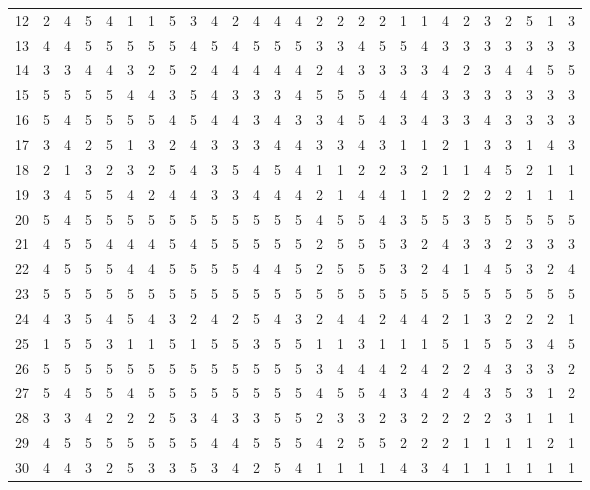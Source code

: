 \begin{table}[htbp]
{\begin{tabular}{c *{26}{c}}
12 & 2 & 4 & 5 & 4 & 1 & 1 & 5 & 3 & 4 & 2 & 4 & 4 & 4 & 2 & 2 & 2 & 2 & 1 & 1 & 4 & 2 & 3 & 2 & 5 & 1 & 3 \\
13 & 4 & 4 & 5 & 5 & 5 & 5 & 5 & 4 & 5 & 4 & 5 & 5 & 5 & 3 & 3 & 4 & 5 & 5 & 4 & 3 & 3 & 3 & 3 & 3 & 3 & 3 \\
14 & 3 & 3 & 4 & 4 & 3 & 2 & 5 & 2 & 4 & 4 & 4 & 4 & 4 & 2 & 4 & 3 & 3 & 3 & 3 & 4 & 2 & 3 & 4 & 4 & 5 & 5 \\
15 & 5 & 5 & 5 & 5 & 4 & 4 & 3 & 5 & 4 & 3 & 3 & 3 & 4 & 5 & 5 & 5 & 4 & 4 & 4 & 3 & 3 & 3 & 3 & 3 & 3 & 3 \\
16 & 5 & 4 & 5 & 5 & 5 & 5 & 4 & 5 & 4 & 4 & 3 & 4 & 3 & 3 & 4 & 5 & 4 & 3 & 4 & 3 & 3 & 4 & 3 & 3 & 3 & 3 \\
17 & 3 & 4 & 2 & 5 & 1 & 3 & 2 & 4 & 3 & 3 & 3 & 4 & 4 & 3 & 3 & 4 & 3 & 1 & 1 & 2 & 1 & 3 & 3 & 1 & 4 & 3 \\
18 & 2 & 1 & 3 & 2 & 3 & 2 & 5 & 4 & 3 & 5 & 4 & 5 & 4 & 1 & 1 & 2 & 2 & 3 & 2 & 1 & 1 & 4 & 5 & 2 & 1 & 1 \\
19 & 3 & 4 & 5 & 5 & 4 & 2 & 4 & 4 & 3 & 3 & 4 & 4 & 4 & 2 & 1 & 4 & 4 & 1 & 1 & 2 & 2 & 2 & 2 & 1 & 1 & 1 \\
20 & 5 & 4 & 5 & 5 & 5 & 5 & 5 & 5 & 5 & 5 & 5 & 5 & 5 & 4 & 5 & 5 & 4 & 3 & 5 & 5 & 3 & 5 & 5 & 5 & 5 & 5 \\
21 & 4 & 5 & 5 & 4 & 4 & 4 & 5 & 4 & 5 & 5 & 5 & 5 & 5 & 2 & 5 & 5 & 5 & 3 & 2 & 4 & 3 & 3 & 2 & 3 & 3 & 3 \\
22 & 4 & 5 & 5 & 5 & 4 & 4 & 5 & 5 & 5 & 5 & 4 & 4 & 5 & 2 & 5 & 5 & 5 & 3 & 2 & 4 & 1 & 4 & 5 & 3 & 2 & 4 \\
23 & 5 & 5 & 5 & 5 & 5 & 5 & 5 & 5 & 5 & 5 & 5 & 5 & 5 & 5 & 5 & 5 & 5 & 5 & 5 & 5 & 5 & 5 & 5 & 5 & 5 & 5 \\
24 & 4 & 3 & 5 & 4 & 5 & 4 & 3 & 2 & 4 & 2 & 5 & 4 & 3 & 2 & 4 & 4 & 2 & 4 & 4 & 2 & 1 & 3 & 2 & 2 & 2 & 1 \\
25 & 1 & 5 & 5 & 3 & 1 & 1 & 5 & 1 & 5 & 5 & 3 & 5 & 5 & 1 & 1 & 3 & 1 & 1 & 1 & 5 & 1 & 5 & 5 & 3 & 4 & 5 \\
26 & 5 & 5 & 5 & 5 & 5 & 5 & 5 & 5 & 5 & 5 & 5 & 5 & 5 & 3 & 4 & 4 & 4 & 2 & 4 & 2 & 2 & 4 & 3 & 3 & 3 & 2 \\
27 & 5 & 4 & 5 & 5 & 4 & 5 & 5 & 5 & 5 & 5 & 5 & 5 & 5 & 4 & 5 & 5 & 4 & 3 & 4 & 2 & 4 & 3 & 5 & 3 & 1 & 2 \\
28 & 3 & 3 & 4 & 2 & 2 & 2 & 5 & 3 & 4 & 3 & 3 & 5 & 5 & 2 & 3 & 3 & 2 & 3 & 2 & 2 & 2 & 2 & 3 & 1 & 1 & 1 \\
29 & 4 & 5 & 5 & 5 & 5 & 5 & 5 & 5 & 4 & 4 & 5 & 5 & 5 & 4 & 2 & 5 & 5 & 2 & 2 & 2 & 1 & 1 & 1 & 1 & 2 & 1 \\
30 & 4 & 4 & 3 & 2 & 5 & 3 & 3 & 5 & 3 & 4 & 2 & 5 & 4 & 1 & 1 & 1 & 1 & 4 & 3 & 4 & 1 & 1 & 1 & 1 & 1 & 1 \\
\bottomrule
\end{tabular}%
}
\end{table}
